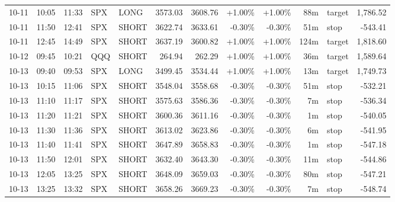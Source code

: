 \documentclass[11pt,a4paper,twoside]{article}
\begin{document}
\begin{center}
\begin{longtable}{>{\color{txtmain}}l l l l l r r r r r >{\color{txtmain}}l r}
10-11 & 10:05 & 11:33 & SPX & LONG & 3573.03 & 3608.76 & \textcolor{wingreen}{+1.00\%} & \textcolor{wingreen}{+1.00\%} & 88m & target & \textcolor{wingreen}{1,786.52} \\
10-11 & 11:50 & 12:41 & SPX & SHORT & 3622.74 & 3633.61 & \textcolor{lossred}{-0.30\%} & \textcolor{lossred}{-0.30\%} & 51m & stop & \textcolor{lossred}{-543.41} \\
10-11 & 12:45 & 14:49 & SPX & SHORT & 3637.19 & 3600.82 & \textcolor{wingreen}{+1.00\%} & \textcolor{wingreen}{+1.00\%} & 124m & target & \textcolor{wingreen}{1,818.60} \\
10-12 & 09:45 & 10:21 & QQQ & SHORT & 264.94 & 262.29 & \textcolor{wingreen}{+1.00\%} & \textcolor{wingreen}{+1.00\%} & 36m & target & \textcolor{wingreen}{1,589.64} \\
10-13 & 09:40 & 09:53 & SPX & LONG & 3499.45 & 3534.44 & \textcolor{wingreen}{+1.00\%} & \textcolor{wingreen}{+1.00\%} & 13m & target & \textcolor{wingreen}{1,749.73} \\
10-13 & 10:15 & 11:06 & SPX & SHORT & 3548.04 & 3558.68 & \textcolor{lossred}{-0.30\%} & \textcolor{lossred}{-0.30\%} & 51m & stop & \textcolor{lossred}{-532.21} \\
10-13 & 11:10 & 11:17 & SPX & SHORT & 3575.63 & 3586.36 & \textcolor{lossred}{-0.30\%} & \textcolor{lossred}{-0.30\%} & 7m & stop & \textcolor{lossred}{-536.34} \\
10-13 & 11:20 & 11:21 & SPX & SHORT & 3600.36 & 3611.16 & \textcolor{lossred}{-0.30\%} & \textcolor{lossred}{-0.30\%} & 1m & stop & \textcolor{lossred}{-540.05} \\
10-13 & 11:30 & 11:36 & SPX & SHORT & 3613.02 & 3623.86 & \textcolor{lossred}{-0.30\%} & \textcolor{lossred}{-0.30\%} & 6m & stop & \textcolor{lossred}{-541.95} \\
10-13 & 11:40 & 11:41 & SPX & SHORT & 3647.89 & 3658.83 & \textcolor{lossred}{-0.30\%} & \textcolor{lossred}{-0.30\%} & 1m & stop & \textcolor{lossred}{-547.18} \\
10-13 & 11:50 & 12:01 & SPX & SHORT & 3632.40 & 3643.30 & \textcolor{lossred}{-0.30\%} & \textcolor{lossred}{-0.30\%} & 11m & stop & \textcolor{lossred}{-544.86} \\
10-13 & 12:05 & 13:25 & SPX & SHORT & 3648.09 & 3659.03 & \textcolor{lossred}{-0.30\%} & \textcolor{lossred}{-0.30\%} & 80m & stop & \textcolor{lossred}{-547.21} \\
10-13 & 13:25 & 13:32 & SPX & SHORT & 3658.26 & 3669.23 & \textcolor{lossred}{-0.30\%} & \textcolor{lossred}{-0.30\%} & 7m & stop & \textcolor{lossred}{-548.74} \\

\end{longtable}
\end{center}
\end{document}
